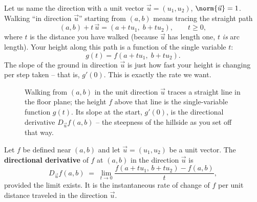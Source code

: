 Let us name the direction with a unit vector
$\vec{u}=(u_1,u_2)$, $\norm{\vec u}=1$. Walking ``in direction $\vec u$''
starting from $(a,b)$ means tracing the straight path
\[
  (a,b) + t\,\vec u = (a + t u_1,\; b + t u_2), \qquad t \ge 0,
\]
where $t$ is the distance you have walked (because $\vec u$ has length one, $t$
\emph{is} arc length). Your height along this path is a function of the single
variable $t$:
\[
  g(t) = f(a + t u_1,\; b + t u_2).
\]
The slope of the ground in direction $\vec u$ is just how fast your height is
changing per step taken -- that is, $g'(0)$. This is exactly the rate we want.

\begin{figure}[H]
\centering
{}
\caption{Walking from $(a,b)$ in the unit direction $\vec u$ traces a straight
line in the floor plane; the height $f$ above that line is the single-variable
function $g(t)$. Its slope at the start, $g'(0)$, is the directional derivative
$D_{\vec u}f(a,b)$ -- the steepness of the hillside as you set off that way.}
\label{ch33:fig-slice}
\end{figure}

\begin{definition}
\label{ch33:def-dirderiv}
Let $f$ be defined near $(a,b)$ and let $\vec u=(u_1,u_2)$ be a unit vector. The
\textbf{directional derivative} of $f$ at $(a,b)$ in the direction $\vec u$ is
\[
  D_{\vec u} f(a,b) \;=\; \lim_{t\to 0}\frac{f(a+tu_1,\,b+tu_2)-f(a,b)}{t},
\]
provided the limit exists. It is the instantaneous rate of change of $f$ per unit
distance traveled in the direction $\vec u$.
\end{definition}

